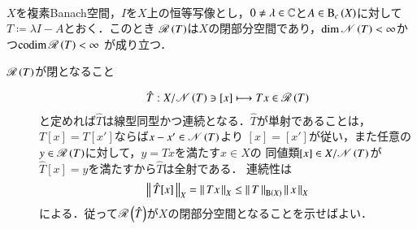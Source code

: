 	\begin{screen}
		\begin{thm}\mbox{}\\
			$X$を複素Banach空間，$I$を$X$上の恒等写像とし，$0 \neq \lambda \in \mathbb{C}$と$A \in \mathrm{B}_c\left(X\right) $に対して
			$T \coloneqq \lambda I - A$とおく．このとき
			$\mathscr{R}\left( T \right)$は$X$の閉部分空間であり，$\operatorname{dim} \mathscr{N}\left( T \right) < \infty$かつ$\operatorname{codim} \mathscr{R}\left( T \right) < \infty$\footnotemark
			が成り立つ．
		\end{thm}
	\end{screen}
	
	\footnotetext{
		$\Codim{\Ran{T}} = \Dim{X/\Ran{T}}$である．
	}
	
	\begin{prf}\mbox{}
		\begin{description}
			\item[$\mathscr{R}\left( T \right)$が閉となること]
				\begin{align}
					\hat{T}:X/\mathscr{N}\left( T \right) \ni [x] \longmapsto Tx \in \mathscr{R}\left( T \right)
				\end{align}
				と定めれば$\hat{T}$は線型同型かつ連続となる．$\hat{T}$が単射であることは，$T[x] = T[x']$ならば$x - x' \in \mathscr{N}\left( T \right)$より
				$[x] = [x']$が従い，また任意の$y \in \mathscr{R}\left( T \right)$に対して，$y = Tx$を満たす$x \in X$の
				同値類$[x] \in X/\mathscr{N}\left( T \right)$が$\hat{T}[x] = y$を満たすから$\hat{T}$は全射である．
				連続性は
				\begin{align}
					\left\|\, \hat{T}[x]\, \right\|_{X} = \left\|\, Tx\, \right\|_{X} \leq \left\|\, T\, \right\|_{\mathrm{B}\left(X\right)} \left\|\, x\, \right\|_{X}
				\end{align}
				による．従って$\mathscr{R}\left( \hat{T} \right)$が$X$の閉部分空間となることを示せばよい．
				
		\end{description}
	\end{prf}
	
	\begin{screen}
		\begin{thm}[Fredholmの交代定理]
			
		\end{thm}
	\end{screen}
	
